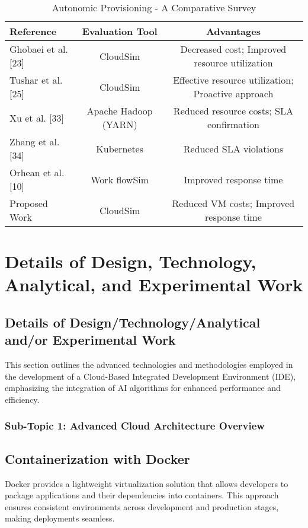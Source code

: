 \documentclass[12pt,a4paper,final]{report}
\begin{document}
\begin{table}[ht]
    \centering
    \caption{Autonomic Provisioning - A Comparative Survey}
    \begin{tabular}{|l|c|c|}
        \hline
        Reference & Evaluation Tool & Advantages \\ \hline
        Ghobaei et al. [23] & CloudSim & Decreased cost; Improved resource utilization \\ \hline
        Tushar et al. [25] & CloudSim & Effective resource utilization; Proactive approach \\ \hline
        Xu et al. [33] & Apache Hadoop (YARN) & Reduced resource costs; SLA confirmation \\ \hline
        Zhang et al. [34] & Kubernetes & Reduced SLA violations \\ \hline
        Orhean et al. [10] & Work flowSim & Improved response time \\ \hline
        Proposed Work & CloudSim & Reduced VM costs; Improved response time \\ \hline
        \bottomrule
    \end{tabular}
\end{table}





\chapter{Details of Design, Technology, Analytical, and Experimental Work}
\newpage
\section{Details of Design/Technology/Analytical and/or Experimental Work}

This section outlines the advanced technologies and methodologies employed in the development of a Cloud-Based Integrated Development Environment (IDE), emphasizing the integration of AI algorithms for enhanced performance and efficiency.

\subsection{Sub-Topic 1: Advanced Cloud Architecture Overview}

\section{Containerization with Docker}
\hspace{1cm}
Docker provides a lightweight virtualization solution that allows developers to package applications and their dependencies into containers. This approach ensures consistent environments across development and production stages, making deployments seamless.
\end{document}
